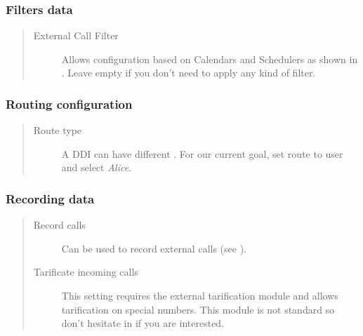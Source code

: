 \documentclass[letterpaper,10pt,english]{sphinxmanual}
\begin{document}
\subsubsection{Filters data}
\label{administration_portal/client/vpbx/ddis:filters-data}\begin{quote}
\begin{description}
\item[{External Call Filter}] \leavevmode
Allows configuration based on Calendars and Schedulers as shown in
{\hyperref[administration_portal/client/vpbx/routing_tools/external_call_filters:external\string-call\string-filters]{}}. Leave empty if you don't need to apply any
kind of filter.

\end{description}
\end{quote}


\subsubsection{Routing configuration}
\label{administration_portal/client/vpbx/ddis:routing-configuration}\begin{quote}
\begin{description}
\item[{Route type}] \leavevmode
A DDI can have different {\hyperref[administration_portal/client/vpbx/ddis:routing\string-logics]{}}. For our
current goal, set route to user and select \emph{Alice}.

\end{description}
\end{quote}


\subsubsection{Recording data}
\label{administration_portal/client/vpbx/ddis:recording-data}\begin{quote}
\begin{description}
\item[{Record calls}] \leavevmode
Can be used to record external calls (see {\hyperref[administration_portal/client/vpbx/calls/call_recordings:call\string-recordings]{}}).

\item[{Tarificate incoming calls}] \leavevmode
This setting requires the external tarification module and allows
tarification on special numbers. This module is not standard so don't
hesitate in {\hyperref[basic_concepts/intro/getting_help:getting\string-help]{}} if you are interested.

\end{description}
\end{quote}
\end{document}
